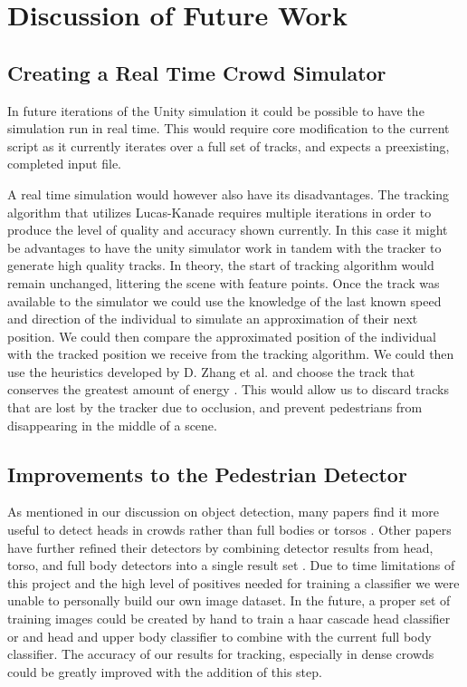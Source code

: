 \documentclass[12pt, onecolumn, conference]{IEEEtran}
\begin{document}
\section{Discussion of Future Work}

\subsection{Creating a Real Time Crowd Simulator}

In future iterations of the Unity simulation it could be possible to have the simulation run in real time. This would require core modification to the current script as it currently iterates over a full set of tracks, and expects a preexisting, completed input file.  

A real time simulation would however also have its disadvantages. The tracking algorithm that utilizes Lucas-Kanade requires multiple iterations in order to produce the level of quality and accuracy shown currently. In this case it might be advantages to have the unity simulator work in tandem with the tracker to generate high quality tracks. In theory, the start of tracking algorithm would remain unchanged, littering the scene with feature points. Once the track was available to the simulator we could use the knowledge of the last known speed and direction of the individual to simulate an approximation of their next position. We could then compare the approximated position of the individual with the tracked position we receive from the tracking algorithm. We could then use the heuristics developed by D. Zhang et al. and choose the track that conserves the greatest amount of energy \cite{D. Zhang}. This would allow us to discard tracks that are lost by the tracker due to occlusion, and prevent pedestrians from disappearing in the middle of a scene. 

\subsection{Improvements to the Pedestrian Detector}

As mentioned in our discussion on object detection, many papers find it more useful to detect heads in crowds rather than full bodies or torsos \cite{M. Rodriguez}\cite{D. Zhang}\cite{I. Ali}. Other papers have further refined their detectors by combining detector results from head, torso, and full body detectors into a single result set \cite{G. Shu}. Due to time limitations of this project and the high level of positives needed for training a classifier we were unable to personally build our own image dataset. In the future, a proper set of training images could be created by hand to train a haar cascade head classifier or and head and upper body classifier to combine with the current full body classifier. The accuracy of our results for tracking, especially in dense crowds could be greatly improved with the addition of this step. 
\end{document}
